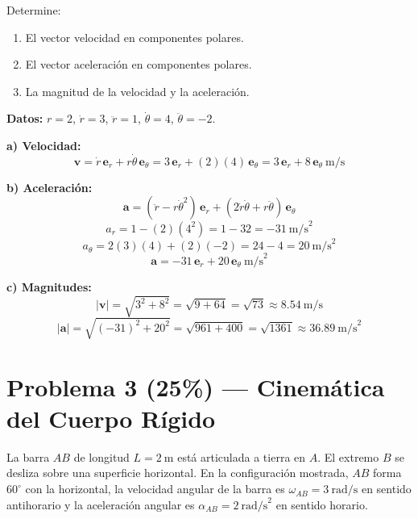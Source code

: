\documentclass[12pt,a4paper]{article}
\begin{document}
Determine:

\begin{enumerate}[label=\alph*)]
    \item El vector velocidad en componentes polares.
    \item El vector aceleración en componentes polares.
    \item La magnitud de la velocidad y la aceleración.
\end{enumerate}

\vspace{0.5cm}

\begin{solbox}
\textbf{Datos:} $r=2$, $\dot{r}=3$, $\ddot{r}=1$, $\dot{\theta}=4$, $\ddot{\theta}=-2$.

\textbf{a) Velocidad:}
\[
\mathbf{v} = \dot{r}\,\mathbf{e}_r + r\dot{\theta}\,\mathbf{e}_\theta
= 3\,\mathbf{e}_r + (2)(4)\,\mathbf{e}_\theta
= \boxed{3\,\mathbf{e}_r + 8\,\mathbf{e}_\theta \ \text{m/s}}
\]

\textbf{b) Aceleración:}
\[
\mathbf{a} = (\ddot{r} - r\dot{\theta}^2)\,\mathbf{e}_r
           + (2\dot{r}\dot{\theta} + r\ddot{\theta})\,\mathbf{e}_\theta
\]
\[
a_r = 1 - (2)(4^2) = 1 - 32 = -31\ \text{m/s}^2
\]
\[
a_\theta = 2(3)(4) + (2)(-2) = 24 - 4 = 20\ \text{m/s}^2
\]
\[
\boxed{\mathbf{a} = -31\,\mathbf{e}_r + 20\,\mathbf{e}_\theta \ \text{m/s}^2}
\]

\textbf{c) Magnitudes:}
\[
|\mathbf{v}| = \sqrt{3^2 + 8^2} = \sqrt{9 + 64} = \sqrt{73}
\approx \boxed{8.54\ \text{m/s}}
\]
\[
|\mathbf{a}| = \sqrt{(-31)^2 + 20^2} = \sqrt{961 + 400} = \sqrt{1361}
\approx \boxed{36.89\ \text{m/s}^2}
\]
\end{solbox}

\newpage

\section*{Problema 3 (25\%) --- Cinemática del Cuerpo Rígido}

La barra $AB$ de longitud $L = 2\ \text{m}$ está articulada a tierra en $A$.
El extremo $B$ se desliza sobre una superficie horizontal. En la configuración
mostrada, $AB$ forma $60^\circ$ con la horizontal, la velocidad angular de la
barra es $\omega_{AB} = 3\ \text{rad/s}$ en sentido antihorario y la
aceleración angular es $\alpha_{AB} = 2\ \text{rad/s}^2$ en sentido horario.

\begin{center}
\end{center}
\end{document}
